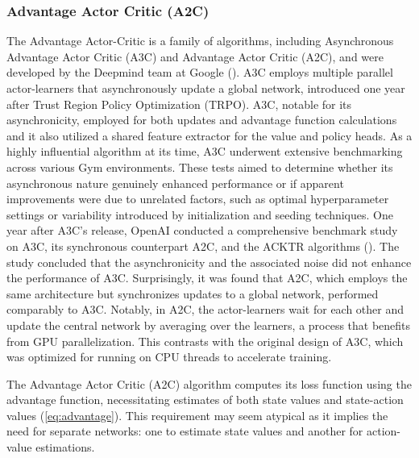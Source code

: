         \subsubsection{Advantage Actor Critic (A2C)}
        \label{sec:a2c}

            \noindent The Advantage Actor-Critic is a family of algorithms, including Asynchronous Advantage Actor Critic (A3C) and Advantage Actor Critic (A2C), and were developed by the Deepmind team at Google (\textcolor{deepblue}{\cite{mnih2016asynchronous}}). A3C employs multiple parallel actor-learners that asynchronously update a global network, introduced one year after Trust Region Policy Optimization (TRPO). A3C, notable for its asynchronicity, employed  for both updates and advantage function calculations and it also utilized a shared feature extractor for the value and policy heads. As a highly influential algorithm at its time, A3C underwent extensive benchmarking across various Gym environments. These tests aimed to determine whether its asynchronous nature genuinely enhanced performance or if apparent improvements were due to unrelated factors, such as optimal hyperparameter settings or variability introduced by initialization and seeding techniques. One year after A3C's release, OpenAI conducted a comprehensive benchmark study on A3C, its synchronous counterpart A2C, and the ACKTR algorithms (\textcolor{deepblue}{\cite{wu2017scalable}}). The study concluded that the asynchronicity and the associated noise did not enhance the performance of A3C. Surprisingly, it was found that A2C, which employs the same architecture but synchronizes  updates to a global network, performed comparably to A3C. Notably, in A2C, the actor-learners wait for each other and update the central network by averaging over the learners, a process that benefits from GPU parallelization. This contrasts with the original design of A3C, which was optimized for running on CPU threads to accelerate training.
            
            \bigskip
            
            \noindent The Advantage Actor Critic (A2C) algorithm computes its loss function using the advantage function, necessitating estimates of both state values and state-action values (\textcolor{deepblue}{\autoref{eq:advantage}}). This requirement may seem atypical as it implies the need for separate networks: one to estimate state values and another for action-value estimations. 
            
